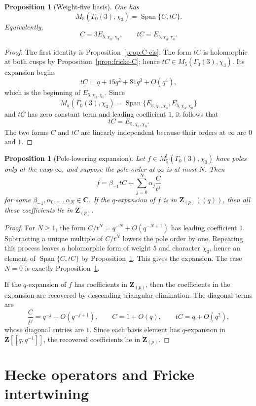 \documentclass[11pt]{amsart}
\newtheorem{proposition}[theorem]{Proposition}
\theoremstyle{remark}
\DeclareMathOperator{\Span}{Span}
\newcommand{\Z}{\mathbf Z}
\newcommand{\C}{\mathbf C}
\newcommand{\G}{\Gamma_0(3)}
\begin{document}
\begin{proposition}[Weight-five basis]\label{prop:weight5basis}
One has
\[
 M_5(\G,\chi_3)=\Span\{C,tC\}.
\]
Equivalently,
\[
 C=3E_{5,\chi_0,\chi_3},
 \qquad
 tC=E_{5,\chi_3,\chi_0}.
\]
\end{proposition}

\begin{proof}
The first identity is Proposition~\ref{prop:C-eis}.  The form $tC$ is holomorphic at both cusps by Proposition~\ref{prop:fricke-C}; hence $tC\in M_5(\G,\chi_3)$.  Its expansion begins
\[
 tC=q+15q^2+81q^3+O(q^4),
\]
which is the beginning of $E_{5,\chi_3,\chi_0}$.  Since
\[
 M_5(\G,\chi_3)=\Span\{E_{5,\chi_0,\chi_3},E_{5,\chi_3,\chi_0}\}
\]
and $tC$ has zero constant term and leading coefficient $1$, it follows that
\[
 tC=E_{5,\chi_3,\chi_0}.
\]
The two forms $C$ and $tC$ are linearly independent because their orders at $\infty$ are $0$ and $1$.
\end{proof}

\begin{proposition}[Pole-lowering expansion]\label{prop:polelowering}
Let $f\in M_5^!(\G,\chi_3)$ have poles only at the cusp $\infty$, and suppose the pole order at $\infty$ is at most $N$.  Then
\[
 f=\beta_{-1}tC+\sum_{j=0}^{N}\alpha_j\frac{C}{t^j}
\]
for some $\beta_{-1},\alpha_0,\ldots,\alpha_N\in\C$.
If the $q$-expansion of $f$ is in $\Z_{(p)}((q))$, then all these coefficients lie in $\Z_{(p)}$.
\end{proposition}

\begin{proof}
For $N\ge1$, the form $C/t^N=q^{-N}+O(q^{-N+1})$ has leading coefficient $1$.  Subtracting a unique multiple of $C/t^N$ lowers the pole order by one.  Repeating this process leaves a holomorphic form of weight $5$ and character $\chi_3$, hence an element of $\Span\{C,tC\}$ by Proposition~\ref{prop:weight5basis}.  This gives the expansion.  The case $N=0$ is exactly Proposition~\ref{prop:weight5basis}.

If the $q$-expansion of $f$ has coefficients in $\Z_{(p)}$, then the coefficients in the expansion are recovered by descending triangular elimination.  The diagonal terms are
\[
 \frac{C}{t^j}=q^{-j}+O(q^{-j+1}),
 \qquad
 C=1+O(q),
 \qquad
 tC=q+O(q^2),
\]
whose diagonal entries are $1$.  Since each basis element has $q$-expansion in $\Z[[q,q^{-1}]]$, the recovered coefficients lie in $\Z_{(p)}$.
\end{proof}

\section{Hecke operators and Fricke intertwining}\label{sec:hecke}
\end{document}
